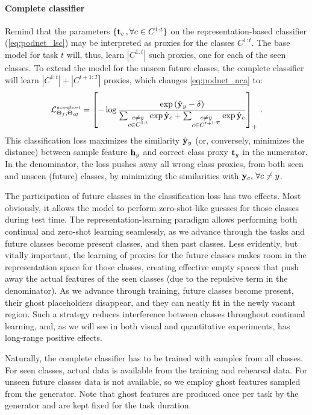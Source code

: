 \paragraph{Complete classifier} Remind that the parameters  $\{\mathbf{t}_c\,,\forall c \in C^{1:t}\}$
on the representation-based classifier (\autoref{eq:podnet_lsc}) may be interpreted as proxies for
the classes $C^{1:t}$. The base model for task $t$ will, thus, learn $|C^{1:t}|$ such proxies, one
for each of the seen classes. To extend the model for the unseen future classes, the complete
classifier will learn $|C^{1:t}| + |C^{t+1:T}|$ proxies, which changes \autoref{eq:podnet_nca} to:
%
\begin{equation}
    \mathcal{L}^\text{\tiny{nca-ghost}}_{\Theta_f,\Theta_{\textit{clf}}} = \left[- \log\frac{\exp\left(\hat{\mathbf{y}}_y - \delta\right)}{\sum_{\substack{c \neq y\\c \in C^{1:t}}} \exp \hat{\mathbf{y}}_{c} + \sum_{\substack{c \neq y\\c \in C^{t+1:T}}} \exp \hat{\mathbf{y}}_{c}} \right]_+ \,.
    \label{eq:ghost_nca}
\end{equation}
%
This classification loss maximizes the similarity $\hat{\mathbf{y}}_y$ (or, conversely, minimizes the distance)
between sample feature $\mathbf{h}_y$ and correct class proxy $\mathbf{t}_y$ in the numerator. In the denominator,
the loss pushes away all wrong class proxies, from both seen and unseen (future) classes, by
minimizing the similarities with $\mathbf{y}_c, \, \forall c \neq y$.

The participation of future classes in the classification loss has two effects. Most obviously, it
allows the model to perform zero-shot-like guesses for those classes during test time. The
representation-learning paradigm allows performing both continual and zero-shot learning seamlessly,
as we advance through the tasks and future classes become present classes, and then past classes.
Less evidently, but vitally important, the learning of proxies for the future classes makes room in
the representation space for those classes, creating effective empty spaces that push away the
actual features of the seen classes (due to the repulsive term in the denominator). As we advance
through training, future classes become present, their ghost placeholders disappear, and they can
neatly fit in the newly vacant region. Such a strategy reduces interference between classes
throughout continual learning, and, as we will see in both visual and quantitative experiments, has
long-range positive effects.

Naturally, the complete classifier has to be trained with samples from all classes. For seen
classes, actual data is available from the training and rehearsal data. For unseen future classes
data is not available, so we employ ghost features sampled from the generator. Note that ghost
features are produced once per task by the generator and are kept fixed for the task duration.
\label{sec:ghost_classifier}

